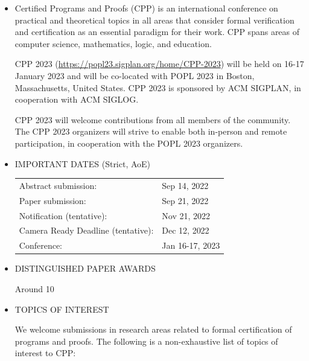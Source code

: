 \documentclass[prodmode,acmtecs]{acmsmall} %
\begin{document}
\begin{itemize}\item  Certified Programs and Proofs (CPP) is an international conference on practical and theoretical topics in all areas that consider formal verification and certification as an essential paradigm for their work. CPP spans areas of computer science, mathematics, logic, and education. 
 
  CPP 2023 (\href{https://popl23.sigplan.org/home/CPP-2023}{https://popl23.sigplan.org/home/CPP-2023}) will be held on 16-17 January 2023 and will be co-located with POPL 2023 in Boston, Massachusetts, United States. CPP 2023 is sponsored by ACM SIGPLAN, in cooperation with ACM SIGLOG. 
 
  CPP 2023 will welcome contributions from all members of the community. The CPP 2023 organizers will strive to enable both in-person and remote participation, in cooperation with the POPL 2023 organizers. 
 
\item  IMPORTANT DATES (Strict, AoE) 
 
\begin{tabulary}{\linewidth}{LL}Abstract submission:  & Sep 14, 2022 \\
Paper submission:  & Sep 21, 2022 \\
Notification (tentative):  & Nov 21, 2022 \\
Camera Ready Deadline (tentative):  & Dec 12, 2022 \\
Conference:  & Jan 16-17, 2023 \\
\end{tabulary}
 
\item  DISTINGUISHED PAPER AWARDS 
 
  Around 10%
 
\item  TOPICS OF INTEREST 
 
  We welcome submissions in research areas related to formal certification of programs and proofs. The following is a non-exhaustive list of topics of interest to CPP: 
 

\end{itemize}
\end{document}
